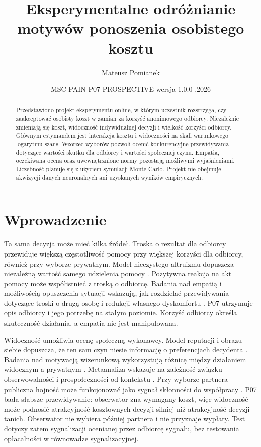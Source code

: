 \documentclass[11pt,a4paper]{article}
\title{Eksperymentalne odróżnianie motywów ponoszenia osobistego kosztu}
\author{Mateusz Pomianek}
\date{MSC-PAIN-P07 \enspace PROSPECTIVE \enspace wersja 1.0.0 \enspace 26.11.2026}
\begin{document}
\maketitle
\begin{abstract}
Przedstawiono projekt eksperymentu online, w którym uczestnik rozstrzyga, czy zaakceptować osobisty koszt w zamian za korzyść anonimowego odbiorcy. Niezależnie zmieniają się koszt, widoczność indywidualnej decyzji i wielkość korzyści odbiorcy. Głównym estymandem jest interakcja kosztu i widoczności na skali warunkowego logarytmu szans. Wzorzec wyborów pozwoli ocenić konkurencyjne przewidywania dotyczące wartości skutku dla odbiorcy i wartości społecznej czynu. Empatia, oczekiwana ocena oraz uwewnętrznione normy pozostają możliwymi wyjaśnieniami. Liczebność planuje się z użyciem symulacji Monte Carlo. Projekt nie obejmuje akwizycji danych neuronalnych ani uzyskanych wyników empirycznych.
\end{abstract}

\section{Wprowadzenie}
Ta sama decyzja może mieć kilka źródeł. Troska o rezultat dla odbiorcy przewiduje większą częstotliwość pomocy przy większej korzyści dla odbiorcy, również przy wyborze prywatnym. Model nieczystego altruizmu dopuszcza niezależną wartość samego udzielenia pomocy \citep{andreoni1990}. Pozytywna reakcja na akt pomocy może współistnieć z troską o odbiorcę. Badania nad empatią i możliwością opuszczenia sytuacji wskazują, jak rozdzielać przewidywania dotyczące troski o drugą osobę i redukcji własnego dyskomfortu \citep{batson1981}. P07 utrzymuje opis odbiorcy i jego potrzebę na stałym poziomie. Korzyść odbiorcy określa skuteczność działania, a empatia nie jest manipulowana.

Widoczność umożliwia ocenę społeczną wykonawcy. Model reputacji i obrazu siebie dopuszcza, że ten sam czyn niesie informację o preferencjach decydenta \citep{benabou2006}. Badania nad motywacją wizerunkową wykorzystują różnicę między działaniem widocznym a prywatnym \citep{ariely2009}. Metaanaliza wskazuje na zależność związku obserwowalności i prospołeczności od kontekstu \citep{bradley2018}. Przy wyborze partnera publiczna hojność może funkcjonować jako sygnał skłonności do współpracy \citep{barclay2007}. P07 bada słabsze przewidywanie: obserwator zna wymagany koszt, więc widoczność może podnosić atrakcyjność kosztownych decyzji silniej niż atrakcyjność decyzji tanich. Obserwator nie wybiera później partnera i nie przyznaje wypłaty. Test dotyczy zatem sygnalizacji ocenianej przez odbiorcę sygnału, bez testowania opłacalności w równowadze sygnalizacyjnej.
\end{document}
